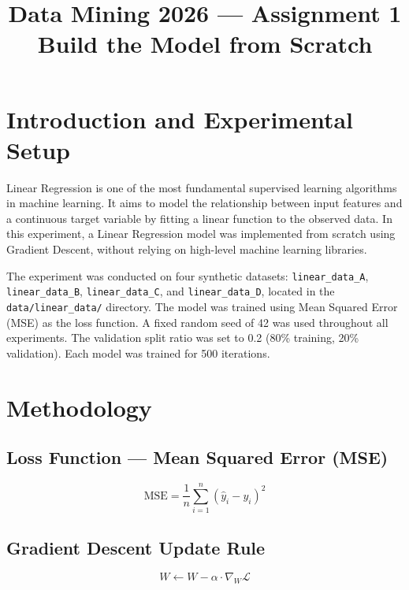 \documentclass{article}
\title{Data Mining 2026 --- Assignment 1\\Build the Model from Scratch}
\author{}
\date{}
\begin{document}
\maketitle

\newpage
\section{Introduction and Experimental Setup}

Linear Regression is one of the most fundamental supervised learning algorithms in machine learning. It aims to model the relationship between input features and a continuous target variable by fitting a linear function to the observed data. In this experiment, a Linear Regression model was implemented from scratch using Gradient Descent, without relying on high-level machine learning libraries.

The experiment was conducted on four synthetic datasets: \texttt{linear\_data\_A}, \texttt{linear\_data\_B}, \texttt{linear\_data\_C}, and \texttt{linear\_data\_D}, located in the \texttt{data/linear\_data/} directory. The model was trained using Mean Squared Error (MSE) as the loss function. A fixed random seed of 42 was used throughout all experiments. The validation split ratio was set to 0.2 (80\% training, 20\% validation). Each model was trained for 500 iterations.

\newpage
\section{Methodology}

\subsection{Loss Function --- Mean Squared Error (MSE)}

\[ \text{MSE} = \frac{1}{n}\sum_{i=1}^{n}(\hat{y}_i - y_i)^2 \]

\subsection{Gradient Descent Update Rule}

\[ W \leftarrow W - \alpha \cdot \nabla_W \mathcal{L} \]
\end{document}

